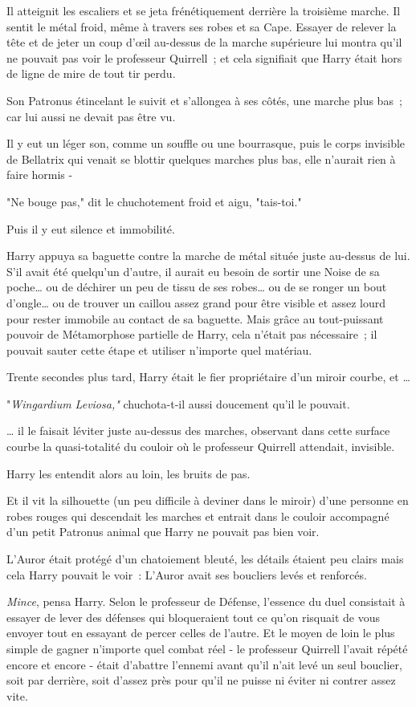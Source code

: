Il atteignit les escaliers et se jeta frénétiquement derrière la troisième marche. Il sentit le métal froid, même à travers ses robes et sa Cape. Essayer de relever la tête et de jeter un coup d'œil au-dessus de la marche supérieure lui montra qu'il ne pouvait pas voir le professeur Quirrell~; et cela signifiait que Harry était hors de ligne de mire de tout tir perdu.

Son Patronus étincelant le suivit et s'allongea à ses côtés, une marche plus bas~; car lui aussi ne devait pas être vu.

Il y eut un léger son, comme un souffle ou une bourrasque, puis le corps invisible de Bellatrix qui venait se blottir quelques marches plus bas, elle n'aurait rien à faire hormis -

"Ne bouge pas," dit le chuchotement froid et aigu, "tais-toi."

Puis il y eut silence et immobilité.

Harry appuya sa baguette contre la marche de métal située juste au-dessus de lui. S'il avait été quelqu'un d'autre, il aurait eu besoin de sortir une Noise de sa poche… ou de déchirer un peu de tissu de ses robes… ou de se ronger un bout d'ongle… ou de trouver un caillou assez grand pour être visible et assez lourd pour rester immobile au contact de sa baguette. Mais grâce au tout-puissant pouvoir de Métamorphose partielle de Harry, cela n'était pas nécessaire~; il pouvait sauter cette étape et utiliser n'importe quel matériau.

Trente secondes plus tard, Harry était le fier propriétaire d'un miroir courbe, et …

"\emph{Wingardium Leviosa,"} chuchota-t-il aussi doucement qu'il le pouvait.

… il le faisait léviter juste au-dessus des marches, observant dans cette surface courbe la quasi-totalité du couloir où le professeur Quirrell attendait, invisible.

Harry les entendit alors au loin, les bruits de pas.

Et il vit la silhouette (un peu difficile à deviner dans le miroir) d'une personne en robes rouges qui descendait les marches et entrait dans le couloir accompagné d'un petit Patronus animal que Harry ne pouvait pas bien voir.

L'Auror était protégé d'un chatoiement bleuté, les détails étaient peu clairs mais cela Harry pouvait le voir~: L'Auror avait ses boucliers levés et renforcés.

\emph{Mince}, pensa Harry. Selon le professeur de Défense, l'essence du duel consistait à essayer de lever des défenses qui bloqueraient tout ce qu'on risquait de vous envoyer tout en essayant de percer celles de l'autre. Et le moyen de loin le plus simple de gagner n'importe quel combat réel - le professeur Quirrell l'avait répété encore et encore - était d'abattre l'ennemi avant qu'il n'ait levé un seul bouclier, soit par derrière, soit d'assez près pour qu'il ne puisse ni éviter ni contrer assez vite.

